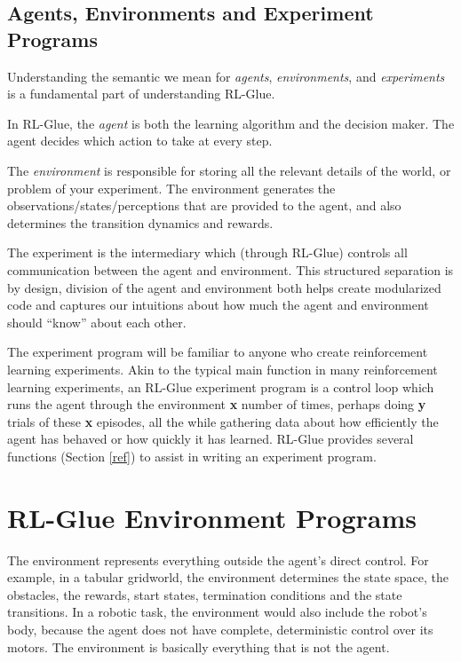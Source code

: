 \documentclass[11pt]{article}
\begin{document}
\subsection{Agents, Environments and Experiment Programs}
Understanding the semantic we mean for \textit{agents}, \textit{environments}, and \textit{experiments} is a fundamental part of understanding RL-Glue.

In RL-Glue, the \textit{agent} is both the learning algorithm and the decision maker. The agent decides which action to take at every step.

The \textit{environment} is responsible for storing all the relevant details of the world, or problem of your experiment. The environment generates the observations/states/perceptions that are provided to the agent, and also determines the transition dynamics and rewards.  

The experiment is the intermediary which (through RL-Glue) controls all communication between the agent and environment.  This structured separation is by design, division of the agent and environment both helps create modularized code and captures our intuitions about how much the agent and environment should ``know'' about each other.

The experiment program will be familiar to anyone who create reinforcement learning experiments. Akin to the typical main function in many reinforcement learning experiments, an RL-Glue experiment program is a control loop which runs the agent through the environment {\bf x} number of times, perhaps doing {\bf y} trials of these {\bf x} episodes, all the while gathering data about how efficiently the agent has behaved or how quickly it has learned. RL-Glue provides several functions (Section \ref{ref}) to assist in writing an experiment program.



\section{RL-Glue Environment Programs}
\label{env}
The environment represents everything outside the agent's direct control. For example, in a tabular gridworld, the environment determines the state space, the obstacles, the rewards, start states, termination conditions and the state transitions.  In a robotic task, the environment would also include the robot's body, because the agent does not have complete, deterministic control over its motors. The environment is basically everything that is not the agent.
\end{document}
